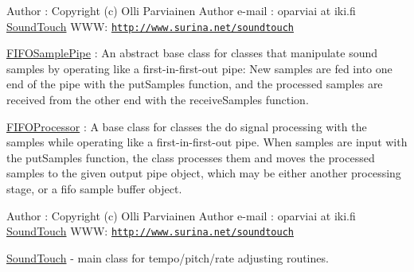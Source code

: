 Author \+: Copyright (c) Olli Parviainen Author e-\/mail \+: oparviai \textquotesingle{}at\textquotesingle{} iki.\+fi \hyperlink{classsoundtouch_1_1_sound_touch}{Sound\+Touch} W\+WW\+: \href{http://www.surina.net/soundtouch}{\tt http\+://www.\+surina.\+net/soundtouch}

\textquotesingle{}\hyperlink{classsoundtouch_1_1_f_i_f_o_sample_pipe}{F\+I\+F\+O\+Sample\+Pipe}\textquotesingle{} \+: An abstract base class for classes that manipulate sound samples by operating like a first-\/in-\/first-\/out pipe\+: New samples are fed into one end of the pipe with the \textquotesingle{}put\+Samples\textquotesingle{} function, and the processed samples are received from the other end with the \textquotesingle{}receive\+Samples\textquotesingle{} function.

\textquotesingle{}\hyperlink{classsoundtouch_1_1_f_i_f_o_processor}{F\+I\+F\+O\+Processor}\textquotesingle{} \+: A base class for classes the do signal processing with the samples while operating like a first-\/in-\/first-\/out pipe. When samples are input with the \textquotesingle{}put\+Samples\textquotesingle{} function, the class processes them and moves the processed samples to the given \textquotesingle{}output\textquotesingle{} pipe object, which may be either another processing stage, or a fifo sample buffer object.

Author \+: Copyright (c) Olli Parviainen Author e-\/mail \+: oparviai \textquotesingle{}at\textquotesingle{} iki.\+fi \hyperlink{classsoundtouch_1_1_sound_touch}{Sound\+Touch} W\+WW\+: \href{http://www.surina.net/soundtouch}{\tt http\+://www.\+surina.\+net/soundtouch}

\hyperlink{classsoundtouch_1_1_sound_touch}{Sound\+Touch} -\/ main class for tempo/pitch/rate adjusting routines.

